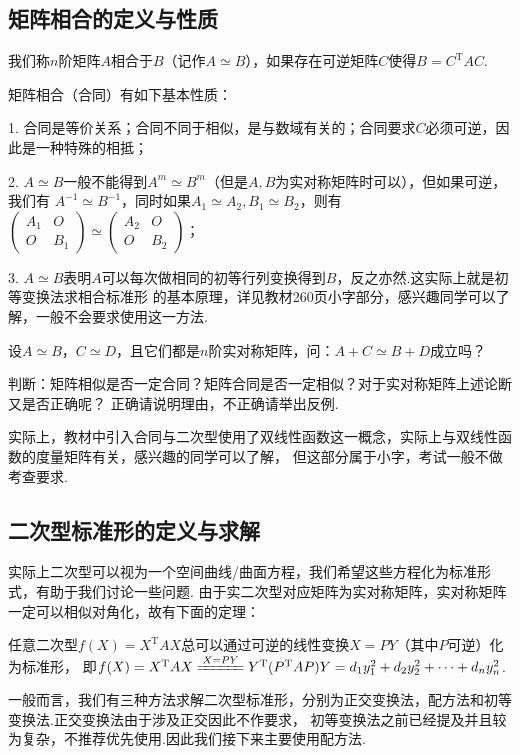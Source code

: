 \subsection{矩阵相合的定义与性质}
\begin{definition}
	我们称$n$阶矩阵$A$相合于$B$（记作$A\simeq B$），如果存在可逆矩阵$C$使得$B=C^\mathrm{T}AC$.
\end{definition}
矩阵相合（合同）有如下基本性质：

1. 合同是等价关系；合同不同于相似，是与数域有关的；合同要求$C$必须可逆，因此是一种特殊的相抵；

2. $A\simeq B$一般不能得到$A^m\simeq B^m$（但是$A,B$为实对称矩阵时可以），但如果可逆，我们有
$A^{-1}\simeq B^{-1}$，同时如果$A_1\simeq A_2,B_1\simeq B_2$，则有$\begin{pmatrix}
	A_1 & O \\ O & B_1
\end{pmatrix}\simeq\begin{pmatrix}
	A_2 & O \\ O & B_2
\end{pmatrix}$；

3. $A\simeq B$表明$A$可以每次做相同的初等行列变换得到$B$，反之亦然.这实际上就是初等变换法求相合标准形
的基本原理，详见教材260页小字部分，感兴趣同学可以了解，一般不会要求使用这一方法.

\begin{example}
	设$A\simeq B$，$C\simeq D$，且它们都是$n$阶实对称矩阵，问：$A+C\simeq B+D$成立吗？
\end{example}
\begin{example}
	判断：矩阵相似是否一定合同？矩阵合同是否一定相似？对于实对称矩阵上述论断又是否正确呢？
	正确请说明理由，不正确请举出反例.
\end{example}
实际上，教材中引入合同与二次型使用了双线性函数这一概念，实际上与双线性函数的度量矩阵有关，感兴趣的同学可以了解，
但这部分属于小字，考试一般不做考查要求.
\subsection{二次型标准形的定义与求解}
实际上二次型可以视为一个空间曲线/曲面方程，我们希望这些方程化为标准形式，有助于我们讨论一些问题.
由于实二次型对应矩阵为实对称矩阵，实对称矩阵一定可以相似对角化，故有下面的定理：
\begin{theorem}
	任意二次型$f(X)=X^\mathrm{T}AX$总可以通过可逆的线性变换$X=PY$（其中$P$可逆）化为标准形，
	即$f(X)=X^\mathrm{T}AX\xlongequal{X=PY}Y^\mathrm{T}(P^\mathrm{T}AP)Y=d_1y_1^2+d_2y_2^2+\cdots+d_ny_n^2$.
\end{theorem}
一般而言，我们有三种方法求解二次型标准形，分别为正交变换法，配方法和初等变换法.正交变换法由于涉及正交因此不作要求，
初等变换法之前已经提及并且较为复杂，不推荐优先使用.因此我们接下来主要使用配方法.

